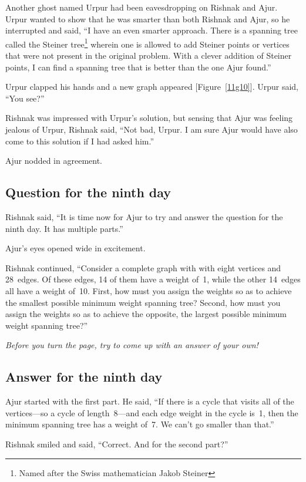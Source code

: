 Another ghost named Urpur had been eavesdropping on Rishnak and Ajur. Urpur wanted to show that he was smarter than both Rishnak and Ajur, so he interrupted and said, ``I have an even smarter approach. There is a spanning tree called the Steiner tree\footnote{Named after the Swiss mathematician Jakob Steiner} wherein one is allowed to add Steiner points or vertices that were not present in the original problem. With a clever addition of Steiner points, I can find a spanning tree that is better than the one Ajur found.''

Urpur clapped his hands and a new graph appeared [Figure~\ref{11g10}]. Urpur said, ``You see?''

Rishnak was impressed with Urpur's solution, but sensing that Ajur was feeling jealous of Urpur, Rishnak said, ``Not bad, Urpur. I am sure Ajur would have also come to this solution if I had asked him.''

Ajur nodded in agreement.

\subsection*{Question for the ninth day}
Rishnak said, ``It is time now for Ajur to try and answer the question for the ninth day. It has multiple parts.''

Ajur's eyes opened wide in excitement.

Rishnak continued, ``Consider a complete graph with with eight vertices and 28~edges. Of these edges, 14 of them have a weight of~1, while the other 14~edges all have a weight of~10. First, how must you assign the weights so as to achieve the smallest possible minimum weight spanning tree? Second, how must you assign the weights so as to achieve the opposite, the largest possible minimum weight spanning tree?''

\textit{Before you turn the page, try to come up with an answer of your own!}

\newpage
\subsection*{Answer for the ninth day}
Ajur started with the first part. He said, ``If there is a cycle that visits all of the vertices---so a cycle of length~8---and each edge weight in the cycle is~1, then the minimum spanning tree has a weight of~7. We can't go smaller than that.''

Rishnak smiled and said, ``Correct. And for the second part?''

